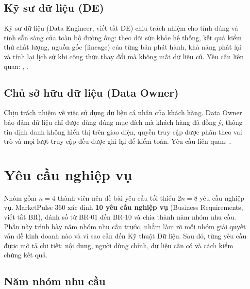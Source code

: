 \subsection{Kỹ sư dữ liệu (DE)}
\label{sec:c1-sh-engineer}
Kỹ sư dữ liệu (Data Engineer, viết tắt DE) chịu trách nhiệm cho tính đúng và tính sẵn sàng của toàn bộ đường ống: theo dõi sức khỏe hệ thống, kết quả kiểm thử chất lượng, nguồn gốc (lineage) của từng bản phát hành, khả năng phát lại và tính lại lịch sử khi công thức thay đổi mà không mất dữ liệu cũ. Yêu cầu liên quan: , .

\subsection{Chủ sở hữu dữ liệu (Data Owner)}
\label{sec:c1-sh-owner}
Chịu trách nhiệm về việc sử dụng dữ liệu cá nhân của khách hàng. Data Owner bảo đảm dữ liệu chỉ được dùng đúng mục đích mà khách hàng đã đồng ý, thông tin định danh không hiển thị trên giao diện, quyền truy cập được phân theo vai trò và mọi lượt truy cập đều được ghi lại để kiểm toán. Yêu cầu liên quan: .

\section{Yêu cầu nghiệp vụ}
\label{sec:c1-business-requirements}

Nhóm gồm $n = 4$ thành viên nên đề bài yêu cầu tối thiểu $2n = 8$ yêu cầu nghiệp vụ. MarketPulse 360 xác định \textbf{10 yêu cầu nghiệp vụ} (Business Requirements, viết tắt BR), đánh số từ BR-01 đến BR-10 và chia thành năm nhóm nhu cầu. Phần này trình bày năm nhóm nhu cầu trước, nhằm làm rõ mỗi nhóm giải quyết vấn đề kinh doanh nào và vì sao cần đến Kỹ thuật Dữ liệu. Sau đó, từng yêu cầu được mô tả chi tiết: nội dung, người dùng chính, dữ liệu cần có và cách kiểm chứng kết quả.

\subsection{Năm nhóm nhu cầu}
\label{sec:c1-nhom-nhu-cau}


